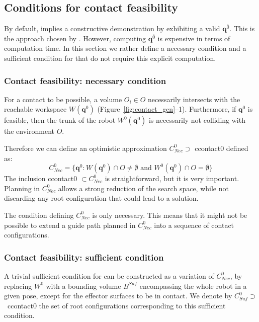 \subsection{Conditions for contact feasibility}
By default,  implies a constructive demonstration by exhibiting a valid $\mathbf{q}^{\overline{0}}$. This is the approach chosen by \cite{Bouyarmane2009}. However, computing $\mathbf{q}^{\overline{0}}$ is expensive in terms of computation time. In this section we rather define a necessary condition and a sufficient condition for  that do not require this explicit computation.




\subsubsection*{Contact feasibility: necessary condition}
For a contact to be possible, a volume $O_i \in O$ necessarily intersects with the reachable workspace $W(\mathbf{q}^{0})$ (Figure~\ref{fig:contact_gen}--1). Furthermore, if $\mathbf{q}^{0}$ is  feasible, then the trunk of the robot $W^0(\mathbf{q}^{0})$ is necessarily not colliding  with the environment $O$.

Therefore we can define an optimistic approximation  $C^0_{Nec} \supset$ \gls{ccontact0} defined as: 
\begin{equation}
C_{Nec}^0 = \{ \mathbf{q}^0 : W(\mathbf{q}^{0}) \cap O \neq \emptyset \text{ and } W^0(\mathbf{q}^{0}) \cap O = \emptyset \} %
\end{equation}
The inclusion \gls{ccontact0} $\subset C^0_{Nec}$ is straightforward, but it is very important.
Planning in $C^0_{Nec}$ allows a strong reduction of the search space, while not discarding 
any root configuration that could lead to a solution.
 
The condition defining $C^0_{Nec}$ is only necessary. This means that it might not be possible to extend a guide path planned 
in $C^0_{Nec}$ into a sequence of contact configurations.

\subsubsection*{Contact feasibility: sufficient condition}
A trivial sufficient condition for  can be constructed as a variation of $C^0_{Nec}$, by replacing $W^0$ with a bounding volume $B^{Suf}$ encompassing the whole robot in a given pose, except for the effector surfaces to be in contact. We denote by \mbox{$C_{Suf}^0 \supset $ \gls{ccontact0}} the set of root configurations corresponding to this sufficient condition.

